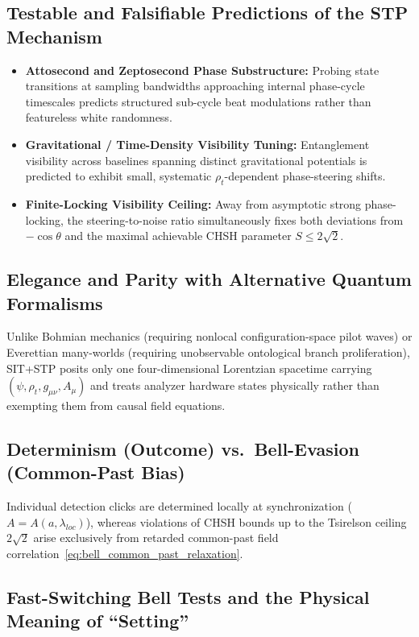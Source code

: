 \documentclass[american,11pt,letterpaper]{article}
\def\mathrm#1{#1}%
\begin{document}
\subsection{Testable and Falsifiable Predictions of the STP Mechanism}

\begin{itemize}
  \item \textbf{Attosecond and Zeptosecond Phase Substructure:} Probing state transitions at sampling bandwidths approaching internal phase-cycle timescales predicts structured sub-cycle beat modulations rather than featureless white randomness.
  \item \textbf{Gravitational / Time-Density Visibility Tuning:} Entanglement visibility across baselines spanning distinct gravitational potentials is predicted to exhibit small, systematic $\rho_t$-dependent phase-steering shifts.
  \item \textbf{Finite-Locking Visibility Ceiling:} Away from asymptotic strong phase-locking, the steering-to-noise ratio simultaneously fixes both deviations from $-\cos\theta$ and the maximal achievable CHSH parameter $S \le 2\sqrt{2}$.
\end{itemize}

\subsection{Elegance and Parity with Alternative Quantum Formalisms}

Unlike Bohmian mechanics (requiring nonlocal configuration-space pilot waves) or Everettian many-worlds (requiring unobservable ontological branch proliferation), SIT+STP posits only one four-dimensional Lorentzian spacetime carrying $(\psi, \rho_t, g_{\mu\nu}, A_\mu)$ and treats analyzer hardware states physically rather than exempting them from causal field equations.

\subsection{Determinism (Outcome) vs.\ Bell-Evasion (Common-Past Bias)}

Individual detection clicks are determined locally at synchronization ($A = A(a,\lambda_{\mathrm{loc}})$), whereas violations of CHSH bounds up to the Tsirelson ceiling $2\sqrt{2}$ arise exclusively from retarded common-past field correlation~\eqref{eq:bell_common_past_relaxation}.

\subsection{Fast-Switching Bell Tests and the Physical Meaning of ``Setting''}
\end{document}
